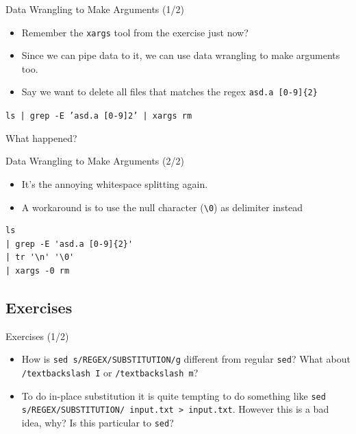 \documentclass[12pt]{beamer}
\begin{document}
\begin{frame}{Data Wrangling to Make Arguments (1/2)}
  \begin{itemize}
    \item Remember the \texttt{xargs} tool from the exercise just now?
    \item Since we can pipe data to it, we can use data wrangling to make arguments too.
    \item Say we want to delete all files that matches the regex \texttt{asd.a [0-9]\{2\}}
  \end{itemize}
  \texttt{ls | grep -E 'asd.a [0-9]{2}' | xargs rm}

  What happened?
\end{frame}

\begin{frame}[fragile]{Data Wrangling to Make Arguments (2/2)}
  \begin{itemize}
    \item It's the annoying whitespace splitting again.
    \item A workaround is to use the null character (\texttt{\textbackslash 0}) as delimiter instead
  \end{itemize}
  \begin{verbatim}
ls
| grep -E 'asd.a [0-9]{2}'
| tr '\n' '\0'
| xargs -0 rm
  \end{verbatim}
\end{frame}

\subsection{Exercises}
\begin{frame}{Exercises (1/2)}
  \begin{itemize}
    \item How is \texttt{sed s/REGEX/SUBSTITUTION/g} different from regular \texttt{sed}? What about \texttt{/textbackslash I} or \texttt{/textbackslash m}?
    \item To do in-place substitution it is quite tempting to do something like \texttt{sed s/REGEX/SUBSTITUTION/ input.txt > input.txt}. However this is a bad idea, why? Is this particular to \texttt{sed}?
  \end{itemize}
\end{frame}
\end{document}

